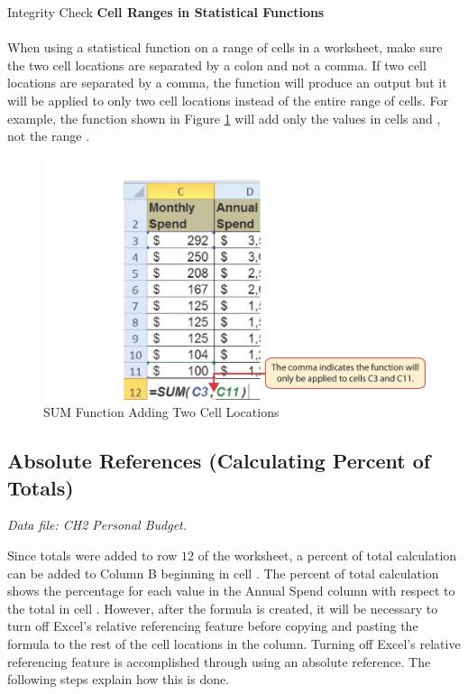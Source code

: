 \begin{center}
	\begin{infobox}{Integrity Check}
		\textbf{Cell Ranges in Statistical Functions}
		\\
		\\
		When using a statistical function on a range of cells in a worksheet, make sure the two cell locations are separated by a colon and not a comma. If two cell locations are separated by a comma, the function will produce an output but it will be applied to only two cell locations instead of the entire range of cells. For example, the  function shown in Figure \ref{02:fig13} will add only the values in cells  and , not the range .
	\end{infobox}
\end{center}

\begin{figure}[H]
	\centering
	\includegraphics[width=\maxwidth{.95\linewidth}]{gfx/ch02_fig13}
	\caption{SUM Function Adding Two Cell Locations}
	\label{02:fig13}
\end{figure}

\subsection{Absolute References (Calculating Percent of Totals)}

\textit{Data file: CH2 Personal Budget.}

Since totals were added to row $ 12 $ of the  worksheet, a percent of total calculation can be added to Column B beginning in cell . The percent of total calculation shows the percentage for each value in the Annual Spend column with respect to the total in cell . However, after the formula is created, it will be necessary to turn off Excel's relative referencing feature before copying and pasting the formula to the rest of the cell locations in the column. Turning off Excel's relative referencing feature is accomplished through using an absolute reference. The following steps explain how this is done.

